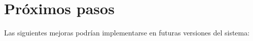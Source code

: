 
    
    
    
    
    

\section{Próximos pasos}

Las siguientes mejoras podrían implementarse en futuras versiones del sistema:

